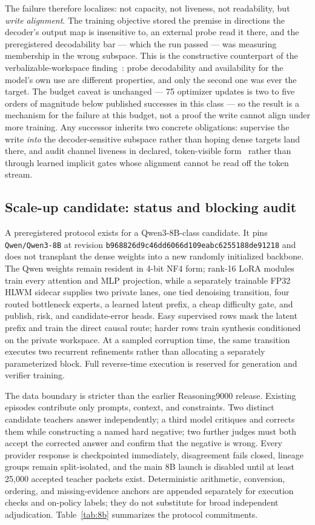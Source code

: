 \documentclass[10pt,a4paper]{article}
\begin{document}
The failure therefore localizes: not capacity, not liveness, not
readability, but \emph{write alignment}. The training objective stored the
premise in directions the decoder's output map is insensitive to, an
external probe read it there, and the preregistered decodability bar ---
which the run passed --- was measuring membership in the wrong subspace.
This is the constructive counterpart of the verbalizable-workspace
finding~\cite{workspace2026}: probe decodability and availability for the
model's own use are different properties, and only the second one was ever
the target. The budget caveat is unchanged --- 75 optimizer updates is two
to five orders of magnitude below published successes in this class --- so
the result is a mechanism for the failure at this budget, not a proof the
write cannot align under more training. Any successor inherits two concrete
obligations: supervise the write \emph{into} the decoder-sensitive subspace
rather than hoping dense targets land there, and audit channel liveness in
declared, token-visible form~\cite{da2026} rather than through learned
implicit gates whose alignment cannot be read off the token stream.

\subsection{Scale-up candidate: status and blocking audit}

A preregistered protocol exists for a Qwen3-8B-class candidate. It pins
\texttt{Qwen/Qwen3-8B} at revision
\texttt{b968826d9c46dd6066d109e\allowbreak abc6255188de91218} and does not transplant the
dense weights into a new randomly initialized backbone. The Qwen weights
remain resident in 4-bit NF4 form; rank-16 LoRA modules train every attention
and MLP projection, while a separately trainable FP32 HLWM sidecar supplies
two private lanes, one tied denoising transition, four routed bottleneck
experts, a learned latent prefix, a cheap difficulty gate, and publish, risk,
and candidate-error heads. Easy supervised rows mask the latent prefix and
train the direct causal route; harder rows train synthesis conditioned on the
private workspace. At a sampled corruption time, the same transition executes
two recurrent refinements rather than allocating a separately parameterized
block. Full reverse-time execution is reserved for generation and verifier
training.

The data boundary is stricter than the earlier Reasoning9000 release.
Existing episodes contribute only prompts, context, and constraints. Two
distinct candidate teachers answer independently; a third model critiques and
corrects them while constructing a named hard negative; two further judges
must both accept the corrected answer and confirm that the negative is wrong.
Every provider response is checkpointed immediately, disagreement fails
closed, lineage groups remain split-isolated, and the main 8B launch is
disabled until at least 25,000 accepted teacher packets exist. Deterministic
arithmetic, conversion, ordering, and missing-evidence anchors are appended
separately for execution checks and on-policy labels; they do not substitute
for broad independent adjudication. Table~\ref{tab:8b} summarizes the
protocol commitments.
\end{document}
